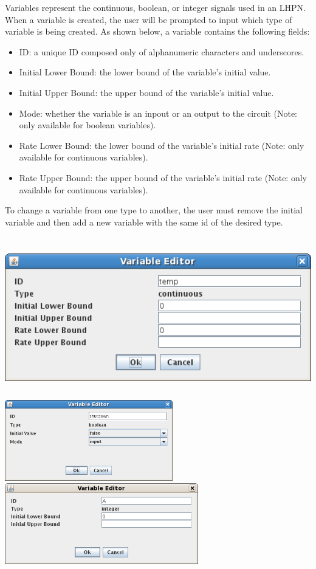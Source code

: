 \documentclass[titlepage,11pt]{article}
\begin{document}
\noindent
Variables represent the continuous, boolean, or integer signals used in an LHPN.
When a variable is created, the user will be prompted to input which type of
variable is being created.
As shown below, a variable contains the following fields:
\begin{itemize}
\item ID: a unique ID composed only of alphanumeric characters and 
       underscores.
\item Initial Lower Bound: the lower bound of the variable's initial value.
\item Initial Upper Bound: the upper bound of the variable's initial value.
\item Mode: whether the variable is an inpout or an output to the circuit
       (Note: only available for boolean variables).
\item Rate Lower Bound: the lower bound of the variable's initial rate 
       (Note: only available for continuous variables).
\item Rate Upper Bound: the upper bound of the variable's initial rate
       (Note: only available for continuous variables).
\end{itemize}
To change a variable from one type to another, the user must remove the initial
variable and then add a new variable with the same id of the desired type.
\begin{center}
\includegraphics[height=70mm]{screenshots/contVariable}
\includegraphics[height=35mm]{screenshots/boolVariable}
\includegraphics[height=35mm]{screenshots/intVariable}
\end{center}
\end{document}
